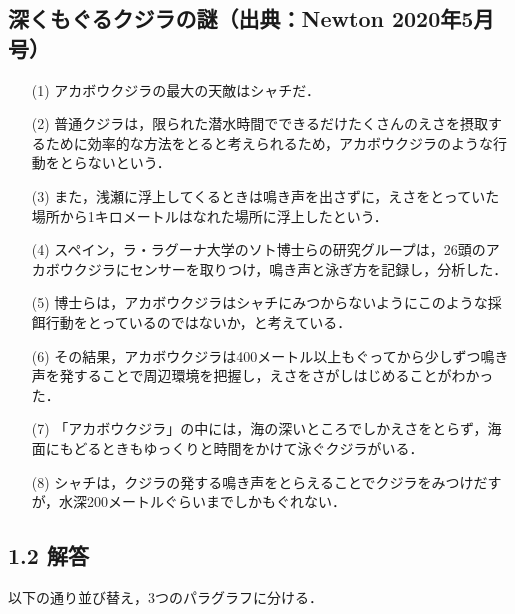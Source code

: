 \documentclass[11pt, a4paper]{jsarticle}
\begin{document}
\subsection{深くもぐるクジラの謎（出典：Newton 2020年5月号）}
\begin{itemize}
\item[(1)]アカボウクジラの最大の天敵はシャチだ．
\item[(2)]普通クジラは，限られた潜水時間でできるだけたくさんのえさを摂取するために効率的な方法をとると考えられるため，アカボウクジラのような行動をとらないという．
\item[(3)]また，浅瀬に浮上してくるときは鳴き声を出さずに，えさをとっていた場所から1キロメートルはなれた場所に浮上したという．
\item[(4)]スペイン，ラ・ラグーナ大学のソト博士らの研究グループは，26頭のアカボウクジラにセンサーを取りつけ，鳴き声と泳ぎ方を記録し，分析した．
\item[(5)]博士らは，アカボウクジラはシャチにみつからないようにこのような採餌行動をとっているのではないか，と考えている．
\item[(6)]その結果，アカボウクジラは400メートル以上もぐってから少しずつ鳴き声を発することで周辺環境を把握し，えさをさがしはじめることがわかった．
\item[(7)]「アカボウクジラ」の中には，海の深いところでしかえさをとらず，海面にもどるときもゆっくりと時間をかけて泳ぐクジラがいる．
\item[(8)]シャチは，クジラの発する鳴き声をとらえることでクジラをみつけだすが，水深200メートルぐらいまでしかもぐれない．
\end{itemize}

\subsection*{1.2 解答}

以下の通り並び替え，3つのパラグラフに分ける．
\end{document}
